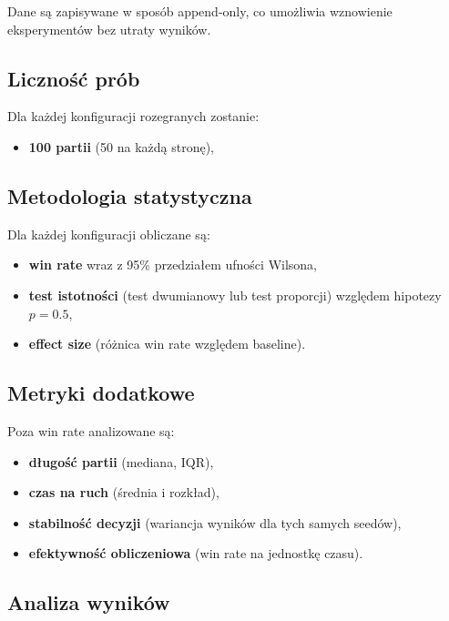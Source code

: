 \documentclass[12pt,a4paper]{article}
\begin{document}
Dane są zapisywane w sposób append-only, co umożliwia wznowienie eksperymentów bez utraty wyników.

\subsection{Liczność prób}

Dla każdej konfiguracji rozegranych zostanie:
\begin{itemize}[leftmargin=2em]
  \item \textbf{100 partii} (50 na każdą stronę),
\end{itemize}


\subsection{Metodologia statystyczna}

Dla każdej konfiguracji obliczane są:

\begin{itemize}[leftmargin=2em]
  \item \textbf{win rate} wraz z 95\% przedziałem ufności Wilsona,
  \item \textbf{test istotności} (test dwumianowy lub test proporcji) względem hipotezy $p = 0.5$,
  \item \textbf{effect size} (różnica win rate względem baseline).
\end{itemize}


\subsection{Metryki dodatkowe}

Poza win rate analizowane są:

\begin{itemize}[leftmargin=2em]
  \item \textbf{długość partii} (mediana, IQR),
  \item \textbf{czas na ruch} (średnia i rozkład),
  \item \textbf{stabilność decyzji} (wariancja wyników dla tych samych seedów),
  \item \textbf{efektywność obliczeniowa} (win rate na jednostkę czasu).
\end{itemize}

\subsection{Analiza wyników}
\end{document}
